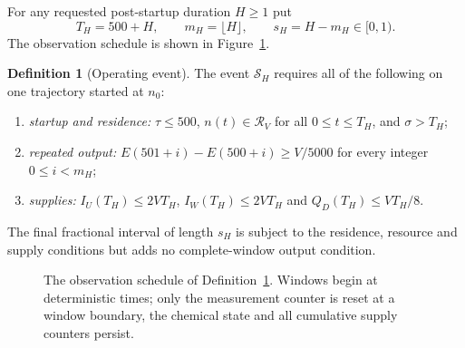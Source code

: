 \documentclass[11pt,a4paper]{article}
\theoremstyle{plain}
\theoremstyle{definition}
\newtheorem{definition}[theorem]{Definition}
\theoremstyle{remark}
\newcommand{\R}{\mathcal R_V}
\newcommand{\Son}{\mathcal S}
\begin{document}
For any requested post-startup duration $H\ge1$ put
\begin{equation}\label{eq:duration}
 T_H=500+H,\qquad m_H=\lfloor H\rfloor,\qquad s_H=H-m_H\in[0,1).
\end{equation}
The observation schedule is shown in Figure~\ref{fig:timeline}.

\begin{definition}[Operating event]\label{def:event}
The event $\Son_H$ requires all of the following on one trajectory started at $n_0$:
\begin{enumerate}[label=(\roman*)]
\item \emph{startup and residence:} $\tau\le500$, $n(t)\in\R$ for all $0\le t\le T_H$, and $\sigma>T_H$;
\item \emph{repeated output:} $E(501+i)-E(500+i)\ge V/5000$ for every integer $0\le i<m_H$;
\item \emph{supplies:} $I_U(T_H)\le2VT_H$, $I_W(T_H)\le2VT_H$ and $Q_D(T_H)\le VT_H/8$.
\end{enumerate}
\end{definition}
The final fractional interval of length $s_H$ is subject to the residence, resource and supply conditions but adds no complete-window output condition.

\begin{figure}[t]
\centering
{}
\caption{The observation schedule of Definition~\ref{def:event}. Windows begin at deterministic times; only the measurement counter is reset at a window boundary, the chemical state and all cumulative supply counters persist.}\label{fig:timeline}
\end{figure}
\end{document}
